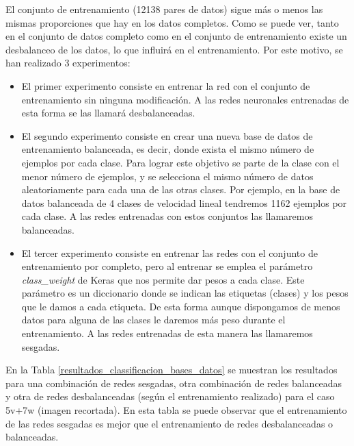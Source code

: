 El conjunto de entrenamiento (12138 pares de datos) sigue más o menos las mismas proporciones que hay en los datos completos. Como se puede ver, tanto en el conjunto de datos completo como en el conjunto de entrenamiento existe un desbalanceo de los datos, lo que influirá en el entrenamiento. Por este motivo, se han realizado 3 experimentos:\\

\begin{itemize}
    \item El primer experimento consiste en entrenar la red con el conjunto de entrenamiento sin ninguna modificación. A las redes neuronales entrenadas de esta forma se las llamará desbalanceadas.
    
    \item El segundo experimento consiste en crear una nueva base de datos de entrenamiento balanceada, es decir, donde exista el mismo número de ejemplos por cada clase. Para lograr este objetivo se parte de la clase con el menor número de ejemplos, y se selecciona el mismo número de datos aleatoriamente para cada una de las otras clases. Por ejemplo, en la base de datos balanceada de 4 clases de velocidad lineal tendremos 1162 ejemplos por cada clase. A las redes entrenadas con estos conjuntos las llamaremos balanceadas.
    
    \item El tercer experimento consiste en entrenar las redes con el conjunto de entrenamiento por completo, pero al entrenar se emplea el parámetro \textit{class\_weight} de Keras que nos permite dar pesos a cada clase. Este parámetro es un diccionario donde se indican las etiquetas (clases) y los pesos que le damos a cada etiqueta. De esta forma aunque dispongamos de menos datos para alguna de las clases le daremos más peso durante el entrenamiento. A las redes entrenadas de esta manera las llamaremos sesgadas.
\end{itemize}


En la Tabla \ref{resultados_classificacion_bases_datos} se muestran los resultados para una combinación de redes sesgadas, otra combinación de redes balanceadas y otra de redes desbalanceadas (según el entrenamiento realizado) para el caso 5v+7w (imagen recortada). En esta tabla se puede observar que el entrenamiento de las redes sesgadas es mejor que el entrenamiento de redes desbalanceadas o balanceadas.\\

